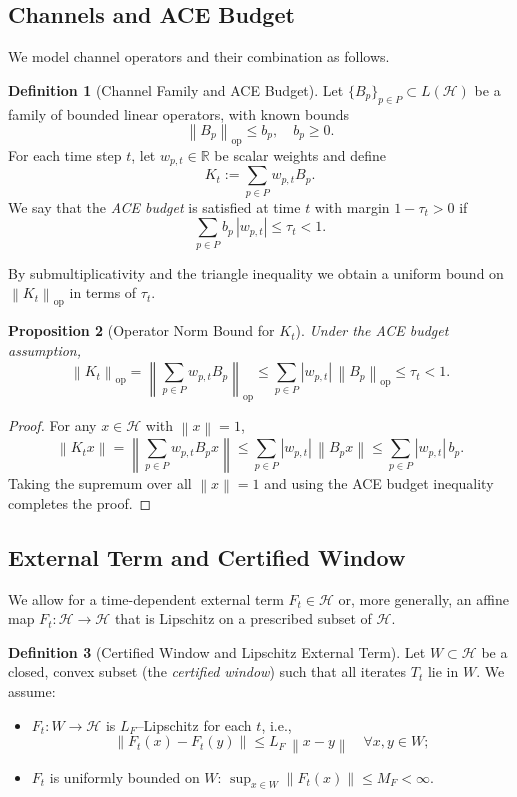 \documentclass[11pt]{article}
\theoremstyle{definition}
\newtheorem{definition}{Definition}[section]
\theoremstyle{plain}
\newtheorem{proposition}[definition]{Proposition}
\theoremstyle{remark}
\newcommand{\Hcal}{\mathcal{H}}
\newcommand{\Rbb}{\mathbb{R}}
\newcommand{\norm}[1]{\left\lVert #1 \right\rVert}
\begin{document}
\subsection{Channels and ACE Budget}

We model channel operators and their combination as follows.

\begin{definition}[Channel Family and ACE Budget]
Let \(\{B_p\}_{p\in P} \subset L(\Hcal)\) be a family of bounded linear operators, with known bounds
\[
  \norm{B_p}_{\mathrm{op}} \le b_p,\quad b_p \ge 0.
\]
For each time step \(t\), let \(w_{p,t} \in \Rbb\) be scalar weights and define
\[
  K_t := \sum_{p\in P} w_{p,t} B_p.
\]
We say that the \emph{ACE budget} is satisfied at time \(t\) with margin \(1-\tau_t>0\) if
\[
  \sum_{p\in P} b_p \, |w_{p,t}| \le \tau_t < 1.
\]
\end{definition}

By submultiplicativity and the triangle inequality we obtain a uniform bound on \(\norm{K_t}_{\mathrm{op}}\) in terms of \(\tau_t\).

\begin{proposition}[Operator Norm Bound for \(K_t\)]
Under the ACE budget assumption,
\[
  \norm{K_t}_{\mathrm{op}}
  = \norm{\textstyle\sum_{p\in P} w_{p,t} B_p}_{\mathrm{op}}
  \le \sum_{p\in P} |w_{p,t}| \, \norm{B_p}_{\mathrm{op}}
  \le \tau_t < 1.
\]
\end{proposition}

\begin{proof}
For any \(x \in \Hcal\) with \(\norm{x}=1\),
\[
  \norm{K_t x}
  = \norm{\textstyle\sum_{p\in P} w_{p,t} B_p x}
  \le \sum_{p\in P} |w_{p,t}|\, \norm{B_p x}
  \le \sum_{p\in P} |w_{p,t}| \, b_p.
\]
Taking the supremum over all \(\norm{x}=1\) and using the ACE budget inequality completes the proof.
\end{proof}

\subsection{External Term and Certified Window}

We allow for a time-dependent external term \(F_t \in \Hcal\) or, more generally, an affine map \(F_t : \Hcal \to \Hcal\) that is Lipschitz on a prescribed subset of \(\Hcal\).

\begin{definition}[Certified Window and Lipschitz External Term]
Let \(W \subset \Hcal\) be a closed, convex subset (the \emph{certified window}) such that all iterates \(T_t\) lie in \(W\).
We assume:
\begin{itemize}
  \item \(F_t : W \to \Hcal\) is \(L_F\)–Lipschitz for each \(t\), i.e.,
  \[
    \norm{F_t(x) - F_t(y)} \le L_F \,\norm{x-y} \quad \forall x,y\in W;
  \]
  \item \(F_t\) is uniformly bounded on \(W\): \(\sup_{x\in W} \norm{F_t(x)} \le M_F < \infty\).
\end{itemize}
\end{definition}
\end{document}
